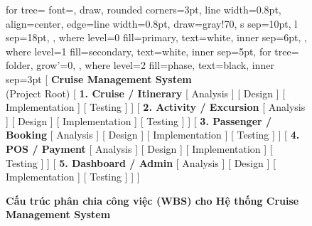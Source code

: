 \documentclass[12pt,a4paper]{article}
\begin{document}
	
	\begin{figure}[h!]
		\centering
		\caption{\textbf{Cấu trúc phân chia công việc (WBS) cho Hệ thống Cruise Management System}}
		\vspace{0.5cm}
		
		\begin{forest}
			for tree={
				font=\sffamily\small,
				draw,
				rounded corners=3pt,
				line width=0.8pt,
				align=center,
				edge={line width=0.8pt, draw=gray!70},
				s sep=10pt, %
				l sep=18pt, %
			},
			where level=0{
				fill=primary, text=white, inner sep=6pt,
			}{},
			where level=1{
				fill=secondary, text=white, inner sep=5pt,
				for tree={
					folder,
					grow'=0,
				}
			}{},
			where level=2{
				fill=phase, text=black, inner sep=3pt
			}{}
			[ \textbf{Cruise Management System} \\ \footnotesize(Project Root)
			[ \textbf{1. Cruise / Itinerary}
			[ Analysis ]
			[ Design ]
			[ Implementation ]
			[ Testing ]
			]
			[ \textbf{2. Activity / Excursion}
			[ Analysis ]
			[ Design ]
			[ Implementation ]
			[ Testing ]
			]
			[ \textbf{3. Passenger / Booking}
			[ Analysis ]
			[ Design ]
			[ Implementation ]
			[ Testing ]
			]
			[ \textbf{4. POS / Payment}
			[ Analysis ]
			[ Design ]
			[ Implementation ]
			[ Testing ]
			]
			[ \textbf{5. Dashboard / Admin}
			[ Analysis ]
			[ Design ]
			[ Implementation ]
			[ Testing ]
			]
			]
		\end{forest}
	\end{figure}
	
\end{document}
